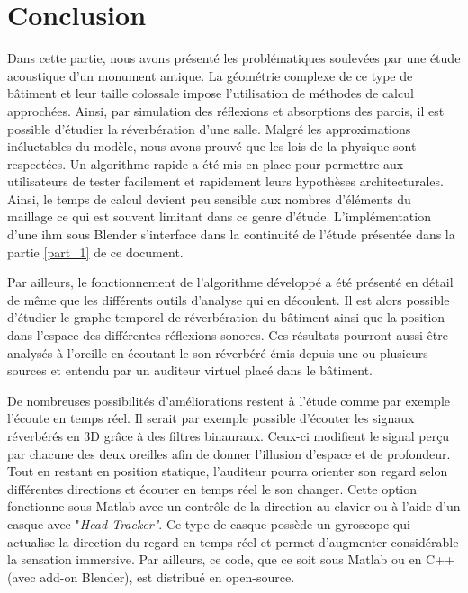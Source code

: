 	
\chapter*{Conclusion}

Dans cette partie, nous avons présenté les problématiques soulevées par une étude acoustique d'un monument antique. La géométrie complexe de ce type de bâtiment et leur taille colossale impose l'utilisation de méthodes de calcul approchées. Ainsi, par simulation des réflexions et absorptions des parois, il est possible d'étudier la réverbération d'une salle. Malgré les approximations inéluctables du modèle, nous avons prouvé que les lois de la physique sont respectées. Un algorithme rapide a été mis en place pour permettre aux utilisateurs de tester facilement et rapidement leurs hypothèses architecturales. Ainsi, le temps de calcul devient peu sensible aux nombres d'éléments du maillage ce qui est souvent limitant dans ce genre d'étude. L'implémentation d'une \gls{ihm} sous Blender s'interface dans la continuité de l'étude présentée dans la partie \ref{part_1} de ce document. 

Par ailleurs, le fonctionnement de l'algorithme développé a été présenté en détail de même que les différents outils d'analyse qui en découlent. Il est alors possible d'étudier le graphe temporel de réverbération du bâtiment ainsi que la position dans l'espace des différentes réflexions sonores. Ces résultats pourront aussi être analysés à l'oreille en écoutant le son réverbéré émis depuis une ou plusieurs sources et entendu par un auditeur virtuel placé dans le bâtiment.

De nombreuses possibilités d'améliorations restent à l'étude comme par exemple l'écoute en temps réel. Il serait par exemple possible d'écouter les signaux réverbérés en 3D grâce à des filtres binauraux. Ceux-ci modifient le signal perçu par chacune des deux oreilles afin de donner l'illusion d'espace et de profondeur. Tout en restant en position statique, l'auditeur pourra orienter son regard selon différentes directions et écouter en temps réel le son changer. Cette option fonctionne sous Matlab avec un contrôle de la direction au clavier ou à l'aide d'un casque avec "\textit{Head Tracker"}. Ce type de casque possède un gyroscope qui actualise la direction du regard en temps réel et permet d'augmenter considérable la sensation immersive. Par ailleurs, ce code, que ce soit sous Matlab ou en C++ (avec add-on Blender), est distribué en open-source. 


